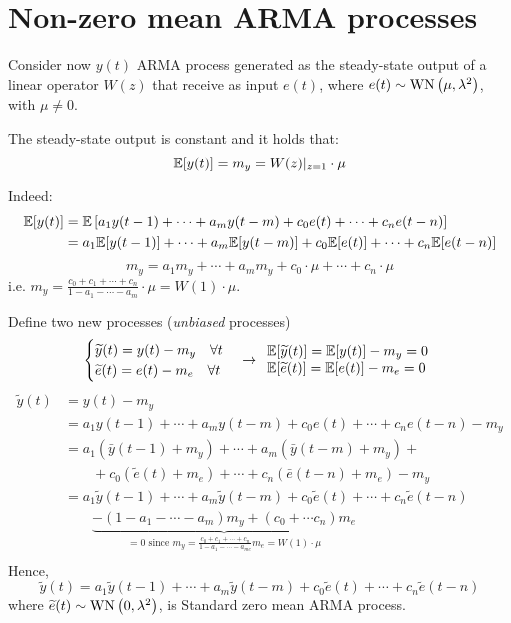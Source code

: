 \section{Non-zero mean ARMA processes}\label{sec:non-zero-mean-arma}
Consider now $y(t)$ ARMA process generated as the steady-state output of a linear operator $W(z)$ that receive as input $e(t)$, where $e(t) \sim \operatorname{WN}\left(\mu, \lambda^{2}\right)$, with $\mu\neq0$.

\begin{theorem}\label{thm:gain-theorem}
	The steady-state output is constant and it holds that:
	\[
		\mathbb{E}[y(t)]=m_{y}=W(z)|_{z=1} \cdot \mu
	\]
\end{theorem}

Indeed:
\begin{align*}
		\mathbb{E}[y(t)] &=\mathbb{E}\left[a_{1} y(t-1)+\cdots+a_{m} y(t-m)+c_{0} e(t)+\cdots+c_{n} e(t-n)\right] \\
		&=a_{1} \mathbb{E}[y(t-1)]+\cdots+a_{m} \mathbb{E}[y(t-m)]+c_{0} \mathbb{E}[e(t)]+\cdots+c_{n} \mathbb{E}[e(t-n)]
\end{align*}
$$
m_{y}=a_{1} m_{y}+\cdots+a_{m} m_{y}+c_{0} \cdot \mu+\cdots+c_{n} \cdot \mu
$$
i.e. $m_{y}=\frac{c_{0}+c_{1}+\cdots+c_{n}}{1-a_{1}-\cdots-a_{m}} \cdot \mu=W(1) \cdot \mu$.
	
Define two new processes (\emph{unbiased} processes)
$$
\begin{cases}
	\widetilde{y}(t)=y(t)-m_{y} \quad\forall t\\
	\widetilde{e}(t)=e(t)-m_{e} \quad\forall t
\end{cases}
\rightarrow \begin{array}{l}
	\mathbb{E}[\widetilde{y}(t)]=\mathbb{E}[y(t)]-m_{y}=0 \\
	\mathbb{E}[\widetilde{e}(t)]=\mathbb{E}[e(t)]-m_{e}=0
\end{array}
$$
\begin{align*}
	\tilde{y}(t)&= y(t)-m_{y}\\
	&= a_{1} y(t-1)+\cdots+a_{m} y(t-m)+c_{0} e(t)+\cdots+c_{n} e(t-n)-m_{y} \\
	&= a_{1}\left(\bar{y}(t-1)+m_{y}\right)+\cdots+a_{m }\left(\bar{y}(t-m)+m_{y}\right)+\\
	&\qquad +c_{0}\left(\tilde{e}(t)+m_{e}\right)+\cdots+c_{n}\left(\bar{e}(t-n)+m_{e}\right)-m_{y} \\
	&= a_{1} \tilde{y}(t-1)+\cdots+a_{m} \tilde{y}(t-m)+c_{0} \tilde{e}(t)+\cdots+c_{n} \tilde{e}(t-n) \\
	&\qquad \underbrace{-\left(1-a_{1}-\cdots-a_{m}\right) m_{y}+\left(c_{0}+\cdots c_{n}\right) m_{e}}_{=0\text { since } m_{y}=\frac{c_{0}+c_{1}+\cdots+c_{n}}{1-a_{1}-\cdots-a_{m e}} m_{e}=W(1) \cdot \mu} \\
\end{align*}
Hence,
$$
\tilde{y}(t)=a_{1} \tilde{y}(t-1)+\cdots+a_{m} \tilde{y}(t-m)+c_{0} \tilde{e}(t)+\cdots+c_{n} \tilde{e}(t-n)
$$
where $\widetilde{e}(t)\sim \operatorname{WN}\left(0, \lambda^{2}\right)$, is Standard zero mean ARMA process.

